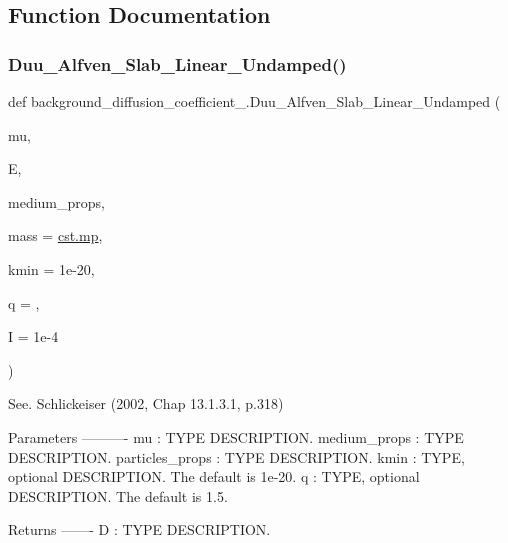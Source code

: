 \subsection{Function Documentation}
\mbox{\label{namespacebackground__diffusion__coefficient__3_a669678cc75709e848975fe28609ced79}} 
\subsubsection{\texorpdfstring{Duu\+\_\+\+Alfven\+\_\+\+Slab\+\_\+\+Linear\+\_\+\+Undamped()}{Duu\_Alfven\_Slab\_Linear\_Undamped()}}
{\footnotesize\ttfamily def background\+\_\+diffusion\+\_\+coefficient\+\_.\+Duu\+\_\+\+Alfven\+\_\+\+Slab\+\_\+\+Linear\+\_\+\+Undamped (\begin{DoxyParamCaption}\item[{}]{mu,  }\item[{}]{E,  }\item[{}]{medium\+\_\+props,  }\item[{}]{mass = {\ttfamily \hyperlink{constants_8h_a6b331c08a80ed71d31c55a3341776483}{cst.\+mp}},  }\item[{}]{kmin = {\ttfamily 1e-\/20},  }\item[{}]{q = {},  }\item[{}]{I = {\ttfamily 1e-\/4} }\end{DoxyParamCaption})}

\begin{DoxyVerb}See. Schlickeiser (2002, Chap 13.1.3.1, p.318)

Parameters
----------
mu : TYPE
    DESCRIPTION.
medium_props : TYPE
    DESCRIPTION.
particles_props : TYPE
    DESCRIPTION.
kmin : TYPE, optional
    DESCRIPTION. The default is 1e-20.
q : TYPE, optional
    DESCRIPTION. The default is 1.5.

Returns
-------
D : TYPE
    DESCRIPTION.\end{DoxyVerb}
 \mbox{\label{namespacebackground__diffusion__coefficient__3_a8e2bcb655f88d8c1ad88bf28a6804b4c}} 
